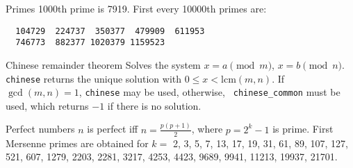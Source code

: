 \clearpage
{}
\categorycontents{}


\begin{algorithm}{Primes}
\desc
1000th prime is 7919. First every 10000th primes are: {\small
\begin{verbatim}
  104729  224737  350377  479909  611953
  746773  882377 1020379 1159523
\end{verbatim}
}\end{algorithm}





\begin{algorithm}{Chinese remainder theorem}
\desc
Solves the system $x = a \pmod m$, $x = b \pmod n$.  {\tt chinese}
returns the unique solution with $0 \le x < \mathrm{lcm}(m, n)$.  If
$\gcd(m,n) = 1$, {\tt chinese} may be used, otherwise, {\tt
chinese\_common} must be used, which returns $-1$ if there is no
solution.
\end{algorithm}


\begin{algorithm}{Perfect numbers}
\label{perfnum}
\desc
$n$ is perfect iff $n = \frac{p(p+1)}{2}$, where $p = 2^k-1$ is prime.
First Mersenne primes are obtained for $k =$ 2, 3, 5, 7, 13, 17, 19,
31, 61, 89, 107, 127, 521, 607, 1279, 2203, 2281, 3217, 4253, 4423,
9689, 9941, 11213, 19937, 21701.\\
\end{algorithm}

